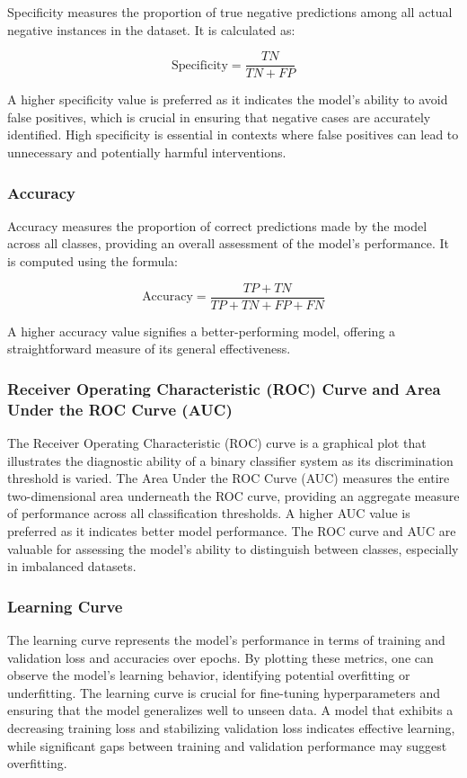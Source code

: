 Specificity measures the proportion of true negative predictions among all actual negative instances in the dataset. It is calculated as:

\[
\text{Specificity} = \frac{TN}{TN + FP}
\]

A higher specificity value is preferred as it indicates the model's ability to avoid false positives, which is crucial in ensuring that negative cases are accurately identified. High specificity is essential in contexts where false positives can lead to unnecessary and potentially harmful interventions.

\subsubsection{Accuracy}

Accuracy measures the proportion of correct predictions made by the model across all classes, providing an overall assessment of the model's performance. It is computed using the formula:

\[
\text{Accuracy} = \frac{TP + TN}{TP + TN + FP + FN}
\]

A higher accuracy value signifies a better-performing model, offering a straightforward measure of its general effectiveness.

\subsubsection{Receiver Operating Characteristic (ROC) Curve and Area Under the ROC Curve (AUC)}

The Receiver Operating Characteristic (ROC) curve is a graphical plot that illustrates the diagnostic ability of a binary classifier system as its discrimination threshold is varied. The Area Under the ROC Curve (AUC) measures the entire two-dimensional area underneath the ROC curve, providing an aggregate measure of performance across all classification thresholds. A higher AUC value is preferred as it indicates better model performance. The ROC curve and AUC are valuable for assessing the model's ability to distinguish between classes, especially in imbalanced datasets.

\subsubsection{Learning Curve}

The learning curve represents the model's performance in terms of training and validation loss and accuracies over epochs. By plotting these metrics, one can observe the model's learning behavior, identifying potential overfitting or underfitting. The learning curve is crucial for fine-tuning hyperparameters and ensuring that the model generalizes well to unseen data. A model that exhibits a decreasing training loss and stabilizing validation loss indicates effective learning, while significant gaps between training and validation performance may suggest overfitting.

